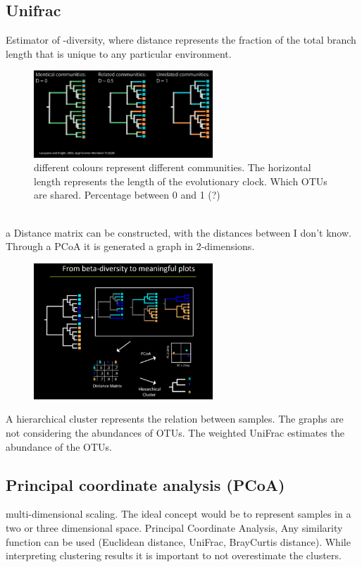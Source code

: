 \subsection{Unifrac}
Estimator of \beta -diversity, where distance represents the fraction of the total branch length that is unique to any particular environment.

\begin{figure}[h]
\caption{different colours represent different communities. The horizontal length represents the length of the evolutionary clock. Which OTUs are shared. Percentage between 0 and 1 (?)} %
\centering
\includegraphics[width=0.6\textwidth]{UniFrac}
\end{figure}

\\

a Distance matrix can be constructed, with the distances between I don't know. 
Through a PCoA it is generated a graph in 2-dimensions. 

\begin{figure}[h]
\caption{}
\centering
\includegraphics[width=0.6\textwidth]{pCoA}
\end{figure}

A hierarchical cluster represents the relation between samples. The graphs are not considering the abundances of OTUs. The weighted UniFrac estimates the abundance of the OTUs. 
\cite{lozuponeQuantitativeQualitativeBeta2007}

\subsection{Principal coordinate analysis (PCoA)}
multi-dimensional scaling. The ideal concept would be to represent samples in a two or three dimensional space. Principal Coordinate Analysis, Any similarity function can be used (Euclidean distance, UniFrac, BrayCurtis distance). While interpreting clustering results it is important to not overestimate the clusters. 


